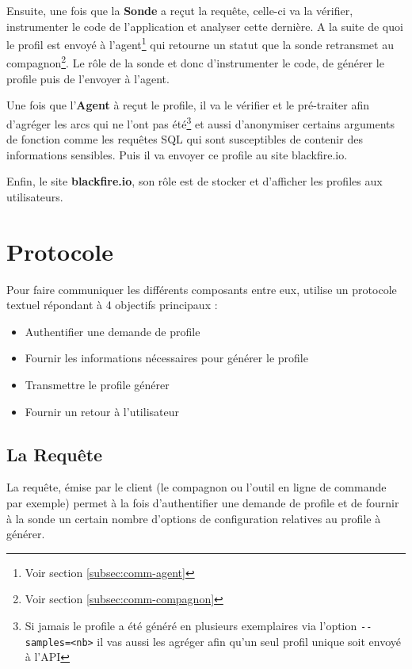 Ensuite, une fois que la \textbf{Sonde} a reçut la requête, celle-ci va la vérifier, instrumenter le code de l'application et analyser cette dernière. A la suite de quoi le profil est envoyé à l'agent\footnote{Voir section \vref{subsec:comm-agent}} qui retourne un statut que la sonde retransmet au compagnon\footnote{Voir section \vref{subsec:comm-compagnon}}. Le rôle de la sonde et donc d'instrumenter le code, de générer le profile puis de l'envoyer à l'agent.

Une fois que l'\textbf{Agent} à reçut le profile, il va le vérifier et le pré-traiter afin d'agréger les arcs qui ne l'ont pas été\footnote{Si jamais le profile a été généré en plusieurs exemplaires via l'option \verb?--samples=<nb>? il vas aussi les agréger afin qu'un seul profil unique soit envoyé à l'API} et aussi d'anonymiser certains arguments de fonction comme les requêtes SQL qui sont susceptibles de contenir des informations sensibles. Puis il va envoyer ce profile au site blackfire.io.

Enfin, le site \textbf{blackfire.io}, son rôle est de stocker et d'afficher les profiles aux utilisateurs.

		\section{Protocole}
			\label{sec:BlackfireProtocol}
Pour faire communiquer les différents composants entre eux, \Blackfire utilise un protocole textuel répondant à 4 objectifs principaux :
\begin{itemize}
\item Authentifier une demande de profile
\item Fournir les informations nécessaires pour générer le profile
\item Transmettre le profile générer
\item Fournir un retour à l'utilisateur
\end{itemize}
			\subsection{La Requête}
			\label{subsec:BlackfireQuery}
La requête, émise par le client (le compagnon ou l'outil en ligne de commande par exemple) permet à la fois d'authentifier une demande de profile et de fournir à la sonde un certain nombre d'options de configuration relatives au profile à générer.

